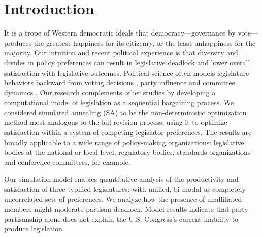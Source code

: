 \documentclass[pdftex,12pt,oribibl]{llncs}
\begin{document}
\section{Introduction}
%
%
%
%

It is a trope of Western democratic ideals that democracy---governance by vote---produces the greatest happiness for its citizenry, or the least unhappiness for the majority.
Our intuition and recent political experience is that diversity and divides in policy preferences can result in legislative deadlock and lower overall satisfaction with legislative outcomes.
Political science often models legislature behaviors backward from voting decisions \parencite{m74, k89}, party influence \parencite{cm93,cm05,a95,k91, k98} and committee dynamics \parencite{sw87, gk89, m04}.
Our research complements other studies by developing a computational model of legislation as a sequential bargaining process.
We considered simulated annealing (SA) to be the non-deterministic optimization method most analogous to the bill revision process; using it to optimize satisfaction within a system of competing legislator preferences. 
The results are broadly applicable to a wide range of policy-making organizations: legislative bodies at the national or local level, regulatory bodies, standards organizations and conference committees, for example.

Our simulation model enables quantitative analysis of the productivity and satisfaction of three typified legislatures: with unified, bi-modal or completely uncorrelated sets of preferences. 
We analyze how the presence of unaffiliated members might moderate partisan deadlock. 
Model results indicate that party partisanship alone does not explain the U.S. Congress's current inability to produce legislation.
\end{document}
